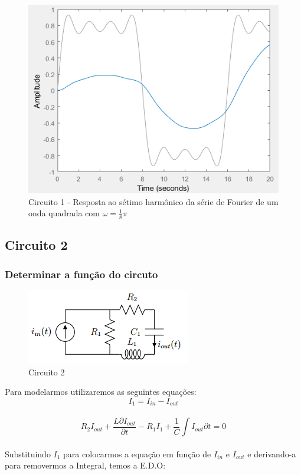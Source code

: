 \documentclass[a4paper, 12pt]{article}
\begin{document}
			\begin{figure}[!ht]
				\centering
				\includegraphics[scale=0.71]{img/1m_circ1.png}
				\caption{Circuito 1 - Resposta ao sétimo harmônico da série de Fourier de um onda quadrada com $\omega = \frac{1}{8}\pi$}
			\end{figure}
		\newpage
		\subsection{Circuito 2}
			\subsubsection{Determinar a função do circuto}
			\begin{figure}[!hb]
				\centering
				\includegraphics{img/circuito2.png}
				\caption{Circuito 2}
			\end{figure}

			Para modelarmos utilizaremos as seguintes equações:
			\[
				 I_{1} = I_{in} - I_{out}
			\] 	\\
			\[
				 R_{2}I_{out} + \frac{L \partial I_{out}}{\partial t} - R_{1}I_{1} + \frac{1}{C}\int I_{out}\partial t = 0
			\] 	\\

			Substituindo $I_{1}$ para colocarmos a equação em função de $I_{in}$ e $I_{out}$ e derivando-a para removermos a Integral, temos a E.D.O:
\end{document}
